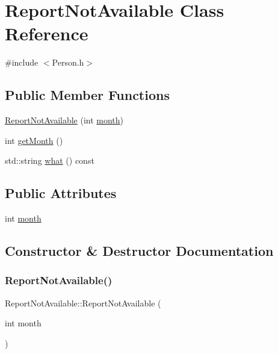\hypertarget{class_report_not_available}{}\section{Report\+Not\+Available Class Reference}
\label{class_report_not_available}


{\ttfamily \#include $<$Person.\+h$>$}

\subsection*{Public Member Functions}
\begin{DoxyCompactItemize}
\item 
\mbox{\hyperlink{class_report_not_available_af8c20e04e062f7922f5507ca31d37854}{Report\+Not\+Available}} (int \mbox{\hyperlink{class_report_not_available_a11686bc53e58de31838b14e6a23ec0c6}{month}})
\item 
int \mbox{\hyperlink{class_report_not_available_a64bf230892d4e34fecb8143d04b95d02}{get\+Month}} ()
\item 
std\+::string \mbox{\hyperlink{class_report_not_available_a2139ebc44990ab772c6e56d0a0d71e7d}{what}} () const
\end{DoxyCompactItemize}
\subsection*{Public Attributes}
\begin{DoxyCompactItemize}
\item 
int \mbox{\hyperlink{class_report_not_available_a11686bc53e58de31838b14e6a23ec0c6}{month}}
\end{DoxyCompactItemize}


\subsection{Constructor \& Destructor Documentation}
\mbox{\label{class_report_not_available_af8c20e04e062f7922f5507ca31d37854}} 
\subsubsection{\texorpdfstring{Report\+Not\+Available()}{ReportNotAvailable()}}
{\footnotesize\ttfamily Report\+Not\+Available\+::\+Report\+Not\+Available (\begin{DoxyParamCaption}\item[{int}]{month }\end{DoxyParamCaption})\hspace{0.3cm}{\ttfamily [inline]}}



